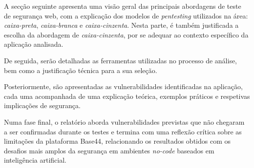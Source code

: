 A secção seguinte apresenta uma visão geral das principais abordagens de teste de segurança web, com a explicação dos modelos de \textit{pentesting} utilizados na área: \textit{caixa-preta}, \textit{caixa-branca} e \textit{caixa-cinzenta}. Nesta parte, é também justificada a escolha da abordagem de \textit{caixa-cinzenta}, por se adequar ao contexto específico da aplicação analisada.

De seguida, serão detalhadas as ferramentas utilizadas no processo de análise, bem como a justificação técnica para a sua seleção.

Posteriormente, são apresentadas as vulnerabilidades identificadas na aplicação, cada uma acompanhada de uma explicação teórica, exemplos práticos e respetivas implicações de segurança.

Numa fase final, o relatório aborda vulnerabilidades previstas que não chegaram a ser confirmadas durante os testes e termina com uma reflexão crítica sobre as limitações da plataforma Base44, relacionando os resultados obtidos com os desafios mais amplos da segurança em ambientes \textit{no-code} baseados em inteligência artificial.
